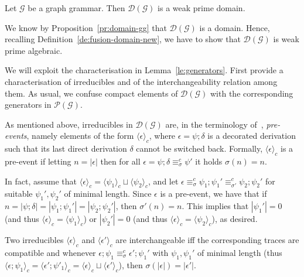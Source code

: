 \documentclass[conference]{IEEEtran}
\renewenvironment{proof}{\begin{IEEEproof}}{\end{IEEEproof}}
\newcommand{\zdom}[0]{\ensuremath{\mathcal{D}}}
\newcommand{\dom}[1]{\ensuremath{\zdom({#1})}}
\newcommand{\poset}[1]{\ensuremath{\mathcal{P}({#1})}}
\newcommand{\perm}{\sigma}
\newcommand{\ltrace}[1]{\ensuremath{\langle {#1}\rangle_c}}
\begin{document}
\begin{theorem}
  \label{th:fusion-domain-for-gg}
  Let $\mathcal{G}$ be a graph grammar. Then
  $\dom{\mathcal{G}}$ is a weak prime domain.
\end{theorem}

\begin{proof}
  We know by Proposition~\ref{pr:domain-gg} that $\dom{\mathcal{G}}$
  is a domain. Hence, recalling Definition~\ref{de:fusion-domain-new},
  we have to show that $\dom{\mathcal{G}}$ is weak prime
  algebraic. 

  We will exploit the characterisation in
  Lemma~\ref{le:generators}. First provide a characterisation of
  irreducibles and of the interchangeability relation among them. As
  usual, we confuse compact elements of $\dom{\mathcal{G}}$ with the
  corresponding generators in $\poset{\mathcal{G}}$.

  \medskip

  As mentioned above, irreducibles in $\dom{\mathcal{G}}$ are, in the
  terminology of~\cite{Handbook,Bal:PhD}, \emph{pre-events}, namely
  elements of the form $\ltrace{\epsilon}$, where
  $\epsilon = \psi; \delta$ is a decorated derivation such that its
  last direct derivation $\delta$ cannot be switched back. Formally,
  $\ltrace{\epsilon}$ is a pre-event if letting $n = |\epsilon|$ then
  for all $\epsilon = \psi; \delta \equiv^c_\perm \psi'$ it holds
  $\perm(n) = n$.

  In fact, assume that
  $\ltrace{\epsilon} = \ltrace{\psi_1} \sqcup \ltrace{\psi_2}$, and
  let
  $\epsilon  \equiv^c_\perm \psi_1 ; \psi_1' \equiv^c_{\perm'} \psi_2;
  \psi_2'$ for suitable $\psi_1', \psi_2'$ of minimal length. 
  Since $\epsilon$ is a pre-event, we have that if
  $n = |\psi; \delta| = |\psi_1 ; \psi_1'| = |\psi_2 ; \psi_2'|$, then
  $\perm'(n) = n$. This implies that $|\psi_1'| = 0$ (and thus
  $\ltrace{\epsilon} = \ltrace{\psi_1}$) or $|\psi_2'| = 0$ (and thus
  $\ltrace{\epsilon} = \ltrace{\psi_2}$),
  as desired. 


   \medskip

   Two irreducibles $\ltrace{\epsilon}$ and $\ltrace{\epsilon'}$ are
   interchangeable iff the corresponding traces are compatible and
   whenever $\epsilon; \psi_1 \equiv^c_{\perm} \epsilon' ; \psi_1'$
   with $\psi_1, \psi_1'$ of minimal length (thus
   $\ltrace{\epsilon; \psi_1} = \ltrace{\epsilon'; \psi'_1} =
   \ltrace{\epsilon} \sqcup \ltrace{\epsilon'}$), then
   $\perm(|\epsilon|) = |\epsilon'|$.


\end{proof}
\end{document}
